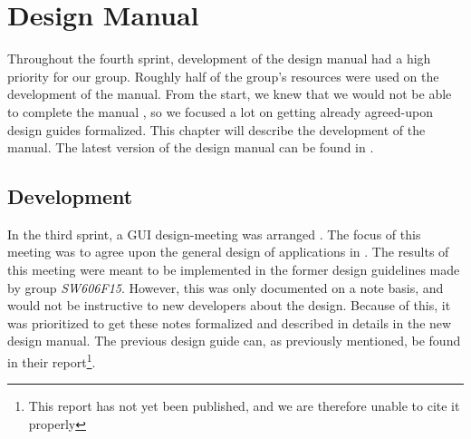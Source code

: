 
\chapter{Design Manual}
\label{cha:design_manual}

Throughout the fourth sprint, development of the design manual had a high priority for our group. Roughly half of the group's resources were used on the development of the manual. From the start, we knew that we would not be able to complete the manual , so we focused a lot on getting already agreed-upon design guides formalized. This chapter will describe the development of the manual. The latest version of the design manual can be found in .

\section{Development}
\label{sec:development}
In the third sprint, a GUI design-meeting was arranged . The focus of this meeting was to agree upon the general design of applications in \giraf. The results of this meeting were meant to be implemented in the former design guidelines made by group \emph{SW606F15}. However, this was only documented on a note basis, and would not be instructive to new \giraf developers about the design. Because of this, it was prioritized to get these notes formalized and described in details in the new design manual. The previous design guide can, as previously mentioned, be found in their report\footnote{This report has not yet been published, and we are therefore unable to cite it properly}.

